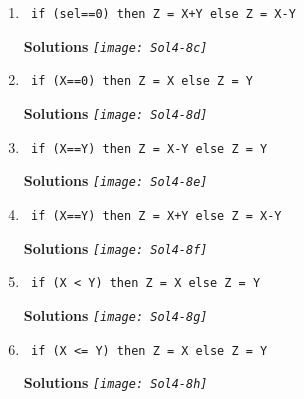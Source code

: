 \begin{enumerate}
\begin{enumerate}
                \item \verb^ if (sel==0) then Z = X+Y else Z = X-Y ^

                    \begin{onlysolution} \textbf{Solutions} \itshape{
                            \texttt{[image: Sol4-8c]}
                        }
                    \end{onlysolution}

                \item \verb^ if (X==0) then Z = X else Z = Y ^

                    \begin{onlysolution} \textbf{Solutions} \itshape{
                            \texttt{[image: Sol4-8d]}
                        }
                    \end{onlysolution}

                \item \verb^ if (X==Y) then Z = X-Y else Z = Y ^

                    \begin{onlysolution} \textbf{Solutions} \itshape{
                            \texttt{[image: Sol4-8e]}
                        }
                    \end{onlysolution}

                \item \verb^ if (X==Y) then Z = X+Y else Z = X-Y ^

                    \begin{onlysolution} \textbf{Solutions} \itshape{
                            \texttt{[image: Sol4-8f]}
                        }
                    \end{onlysolution}

                \item \verb^ if (X < Y) then Z = X else Z = Y ^

                    \begin{onlysolution} \textbf{Solutions} \itshape{
                            \texttt{[image: Sol4-8g]}
                        }
                    \end{onlysolution}

                \item \verb^ if (X <= Y) then Z = X else Z = Y ^

                    \begin{onlysolution} \textbf{Solutions} \itshape{
                            \texttt{[image: Sol4-8h]}
                        }
                    \end{onlysolution}


\end{enumerate}
\end{enumerate}
